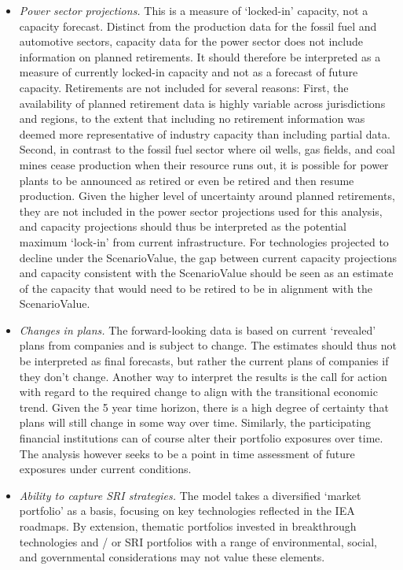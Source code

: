\documentclass[10pt,table,a4]{article}\usepackage[]{graphicx}\usepackage[]{color}
\begin{document}
\begin{multicols}{2}
\begin{itemize}
			\item{\textit{Power sector projections.} This is a measure of `locked-in' capacity, not a capacity forecast. Distinct from the production data for the fossil fuel and automotive sectors, capacity data for the power sector does not include information on planned retirements. It should therefore be interpreted as a measure of currently locked-in capacity and not as a forecast of future capacity. Retirements are not included for several reasons: First, the availability of planned retirement data is highly variable across jurisdictions and regions, to the extent that including no retirement information was deemed more representative of industry capacity than including partial data. Second, in contrast to the fossil fuel sector where oil wells, gas fields, and coal mines cease production when their resource runs out, it is possible for power plants to be announced as retired or even be retired and then resume production. Given the higher level of uncertainty around planned retirements, they are not included in the power sector projections used for this analysis, and capacity projections should thus be interpreted as the potential maximum `lock-in' from current infrastructure. For technologies projected to decline under the ScenarioValue, the gap between current capacity projections and capacity consistent with the ScenarioValue should be seen as an estimate of the capacity that would need to be retired to be in alignment with the ScenarioValue.} 
			
			\item{\textit{Changes in plans. }The forward-looking data is based on current `revealed' plans from companies and is subject to change. The estimates should thus not be interpreted as final forecasts, but rather the current plans of companies if they don't change. Another way to interpret the results is the call for action with regard to the required change to align with the transitional economic trend. Given the 5 year time horizon, there is a high degree of certainty that plans will still change in some way over time. Similarly, the participating financial institutions can of course alter their portfolio exposures over time. The analysis however seeks to be a point in time assessment of future exposures under current conditions.}
			\item{\textit{Ability to capture SRI strategies. }The model takes a diversified `market portfolio' as a basis, focusing on key technologies reflected in the IEA roadmaps. By extension, thematic portfolios invested in breakthrough technologies and / or SRI portfolios with a range of environmental, social, and governmental considerations may not value these elements.}
		\end{itemize}
		
		
	\end{multicols}
	\newpage		
	
\end{document}
